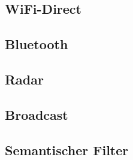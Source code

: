 \subsection{WiFi-Direct}


\subsection{Bluetooth}


\subsection{Radar}


\subsection{Broadcast}


\subsection{Semantischer Filter}
\label{subsec:filter}
